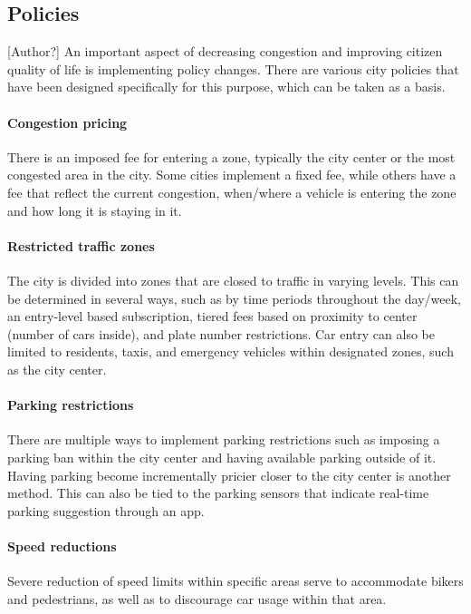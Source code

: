 \documentclass[12pt]{article}                         %
\begin{document}
\subsection{Policies}[Author?]
An important aspect of decreasing congestion and improving citizen quality of life is implementing policy changes. There are various city policies that have been designed specifically for this purpose, which can be taken as a basis. 

\paragraph{Congestion pricing} There is an imposed fee for entering a zone, typically the city center or the most congested area in the city. Some cities implement a fixed fee, while others have a fee that reflect the current congestion, when/where a vehicle is entering the zone and how long it is staying in it.

\paragraph{Restricted traffic zones} The city is divided into zones that are closed to traffic in varying levels. This can be determined in several ways, such as by time periods throughout the day/week, an entry-level based subscription, tiered fees based on proximity to center (number of cars inside), and plate number restrictions. Car entry can also be limited to residents, taxis, and emergency vehicles within designated zones, such as the city center. 

\paragraph{Parking restrictions} There are multiple ways to implement parking restrictions such as imposing a parking ban within the city center and having available parking outside of it. Having parking become incrementally pricier closer to the city center is another method. This can also be tied to the parking sensors that indicate real-time parking suggestion through an app.

\paragraph{Speed reductions} Severe reduction of speed limits within specific areas serve to accommodate bikers and pedestrians, as well as to discourage car usage within that area.
\end{document}
